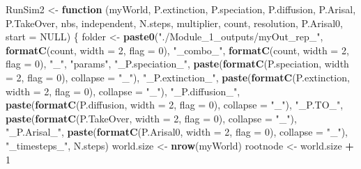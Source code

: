 \documentclass[]{book}
\newenvironment{Shaded}{\begin{snugshade}}{\end{snugshade}}
\newcommand{\KeywordTok}[1]{\textcolor[rgb]{0.13,0.29,0.53}{\textbf{{#1}}}}
\newcommand{\DataTypeTok}[1]{\textcolor[rgb]{0.13,0.29,0.53}{{#1}}}
\newcommand{\DecValTok}[1]{\textcolor[rgb]{0.00,0.00,0.81}{{#1}}}
\newcommand{\StringTok}[1]{\textcolor[rgb]{0.31,0.60,0.02}{{#1}}}
\newcommand{\OtherTok}[1]{\textcolor[rgb]{0.56,0.35,0.01}{{#1}}}
\newcommand{\ControlFlowTok}[1]{\textcolor[rgb]{0.13,0.29,0.53}{\textbf{{#1}}}}
\newcommand{\OperatorTok}[1]{\textcolor[rgb]{0.81,0.36,0.00}{\textbf{{#1}}}}
\newcommand{\NormalTok}[1]{{#1}}
\theoremstyle{definition}
\theoremstyle{definition}
\theoremstyle{definition}
\theoremstyle{remark}
\begin{document}
\begin{Shaded}
\begin{Highlighting}[]
\NormalTok{RunSim2 <-}\StringTok{ }\ControlFlowTok{function}\NormalTok{ (myWorld, P.extinction, P.speciation, P.diffusion, P.Arisal, }
\NormalTok{    P.TakeOver, nbs, independent, N.steps, multiplier, count, }
\NormalTok{    resolution, P.Arisal0, }\DataTypeTok{start =} \OtherTok{NULL}\NormalTok{) }
\NormalTok{\{}
\NormalTok{    folder <-}\StringTok{ }\KeywordTok{paste0}\NormalTok{(}\StringTok{"./Module_1_outputs/myOut_rep_"}\NormalTok{, }\KeywordTok{formatC}\NormalTok{(count, }
        \DataTypeTok{width =} \DecValTok{2}\NormalTok{, }\DataTypeTok{flag =} \DecValTok{0}\NormalTok{), }\StringTok{"_combo_"}\NormalTok{, }\KeywordTok{formatC}\NormalTok{(count, }\DataTypeTok{width =} \DecValTok{2}\NormalTok{, }
        \DataTypeTok{flag =} \DecValTok{0}\NormalTok{), }\StringTok{"_"}\NormalTok{, }\StringTok{"params"}\NormalTok{, }\StringTok{"_P.speciation_"}\NormalTok{, }\KeywordTok{paste}\NormalTok{(}\KeywordTok{formatC}\NormalTok{(P.speciation, }
        \DataTypeTok{width =} \DecValTok{2}\NormalTok{, }\DataTypeTok{flag =} \DecValTok{0}\NormalTok{), }\DataTypeTok{collapse =} \StringTok{"_"}\NormalTok{), }\StringTok{"_P.extinction_"}\NormalTok{, }
        \KeywordTok{paste}\NormalTok{(}\KeywordTok{formatC}\NormalTok{(P.extinction, }\DataTypeTok{width =} \DecValTok{2}\NormalTok{, }\DataTypeTok{flag =} \DecValTok{0}\NormalTok{), }\DataTypeTok{collapse =} \StringTok{"_"}\NormalTok{), }
        \StringTok{"_P.diffusion_"}\NormalTok{, }\KeywordTok{paste}\NormalTok{(}\KeywordTok{formatC}\NormalTok{(P.diffusion, }\DataTypeTok{width =} \DecValTok{2}\NormalTok{, }
            \DataTypeTok{flag =} \DecValTok{0}\NormalTok{), }\DataTypeTok{collapse =} \StringTok{"_"}\NormalTok{), }\StringTok{"_P.TO_"}\NormalTok{, }\KeywordTok{paste}\NormalTok{(}\KeywordTok{formatC}\NormalTok{(P.TakeOver, }
            \DataTypeTok{width =} \DecValTok{2}\NormalTok{, }\DataTypeTok{flag =} \DecValTok{0}\NormalTok{), }\DataTypeTok{collapse =} \StringTok{"_"}\NormalTok{), }\StringTok{"_P.Arisal_"}\NormalTok{, }
        \KeywordTok{paste}\NormalTok{(}\KeywordTok{formatC}\NormalTok{(P.Arisal0, }\DataTypeTok{width =} \DecValTok{2}\NormalTok{, }\DataTypeTok{flag =} \DecValTok{0}\NormalTok{), }\DataTypeTok{collapse =} \StringTok{"_"}\NormalTok{), }
        \StringTok{"_timesteps_"}\NormalTok{, N.steps)}
\NormalTok{    world.size <-}\StringTok{ }\KeywordTok{nrow}\NormalTok{(myWorld)}
\NormalTok{    rootnode <-}\StringTok{ }\NormalTok{world.size }\OperatorTok{+}\StringTok{ }\DecValTok{1}

\end{Highlighting}
\end{Shaded}
\end{document}
